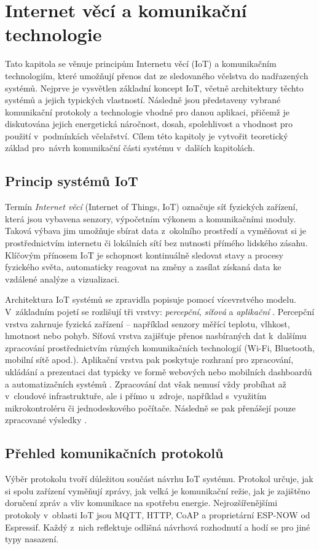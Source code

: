 \chapter{Internet věcí a komunikační technologie}\label{sec:iot_komunikace}
Tato kapitola se věnuje principům Internetu věcí (IoT) a komunikačním technologiím, které umožňují přenos dat ze sledovaného včelstva do nadřazených systémů. Nejprve je vysvětlen základní koncept IoT, včetně architektury těchto systémů a jejich typických vlastností. Následně jsou představeny vybrané komunikační protokoly a technologie vhodné pro danou aplikaci, přičemž je diskutována jejich energetická náročnost, dosah, spolehlivost a vhodnost pro použití v~podmínkách včelařství. Cílem této kapitoly je vytvořit teoretický základ pro~návrh komunikační části systému v~dalších kapitolách.

\section{Princip systémů IoT}
Termín \textit{Internet věcí} (Internet of Things, IoT) označuje síť fyzických zařízení, která jsou vybavena senzory, výpočetním výkonem a komunikačními moduly. Taková výbava jim umožňuje sbírat data z~okolního prostředí a vyměňovat si je prostřednictvím internetu či lokálních sítí bez nutnosti přímého lidského zásahu. Klíčovým přínosem IoT je schopnost kontinuálně sledovat stavy a procesy fyzického světa, automaticky reagovat na změny a zasílat získaná data ke vzdálené analýze a vizualizaci.

Architektura IoT systémů se zpravidla popisuje pomocí vícevrstvého modelu. V~základním pojetí se rozlišují tři vrstvy: \textit{percepční}, \textit{síťová} a \textit{aplikační} \cite{IoTarchitecture}. Percepční vrstva zahrnuje fyzická zařízení -- například senzory měřící teplotu, vlhkost, hmotnost nebo pohyb. Síťová vrstva zajišťuje přenos nasbíraných dat k~dalšímu zpracování prostřednictvím různých komunikačních technologií (Wi-Fi, Bluetooth, mobilní sítě apod.). Aplikační vrstva pak poskytuje rozhraní pro zpracování, ukládání a prezentaci dat typicky ve formě webových nebo mobilních dashboardů a automatizačních systémů \cite{IoTarchitecture}. Zpracování dat však nemusí vždy probíhat až v~cloudové infrastruktuře, ale i přímo u~zdroje, například s~využitím mikrokontroléru či jednodeskového počítače. Následně se pak přenášejí pouze zpracované výsledky \cite{Sabic2025}.

\section{Přehled komunikačních protokolů}
Výběr protokolu tvoří důležitou součást návrhu IoT systému. Protokol určuje, jak si spolu zařízení vyměňují zprávy, jak velká je komunikační režie, jak je zajištěno doručení zpráv a vliv komunikace na spotřebu energie. Nejrozšířenějšími protokoly v~oblasti IoT jsou MQTT, HTTP, CoAP a proprietární ESP-NOW od Espressif. Každý z~nich reflektuje odlišná návrhová rozhodnutí a hodí se pro jiné typy nasazení.

